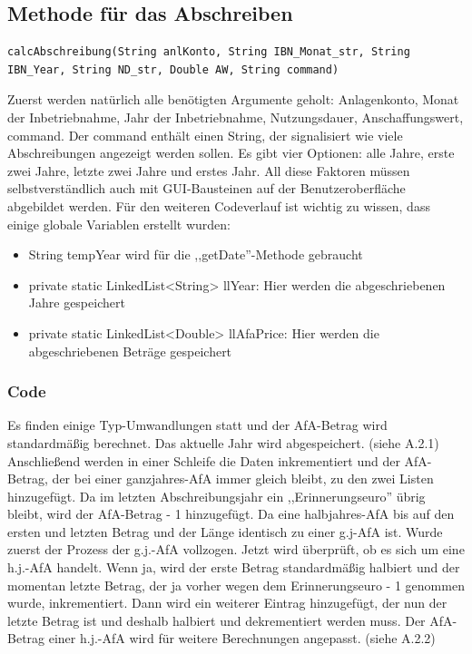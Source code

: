 \documentclass[12pt]{report}
\begin{document}
\subsection{Methode für das Abschreiben}
  
\begin{lstlisting}
calcAbschreibung(String anlKonto, String IBN_Monat_str, String IBN_Year, String ND_str, Double AW, String command)
\end{lstlisting}
Zuerst werden natürlich alle benötigten Argumente geholt: Anlagenkonto, Monat der Inbetriebnahme, Jahr der Inbetriebnahme, Nutzungsdauer, Anschaffungswert, command. Der command enthält einen String, der signalisiert wie viele Abschreibungen angezeigt werden sollen. Es gibt vier Optionen: alle Jahre, erste zwei Jahre, letzte zwei Jahre und erstes Jahr. All diese Faktoren müssen selbstverständlich auch mit GUI-Bausteinen auf der Benutzeroberfläche abgebildet werden.
Für den weiteren Codeverlauf ist wichtig zu wissen, dass einige globale Variablen erstellt wurden:\\

\begin{itemize}
	\item String tempYear wird für die ,,getDate''-Methode gebraucht
	\item private static LinkedList<String> llYear: Hier werden die abgeschriebenen Jahre gespeichert
	\item private static LinkedList<Double> llAfaPrice: Hier werden die abgeschriebenen Beträge gespeichert
\end{itemize}

\subsubsection{Code}
Es finden einige Typ-Umwandlungen statt und der AfA-Betrag wird standardmäßig berechnet. Das aktuelle Jahr wird abgespeichert. (siehe A.2.1)\\



\noindent Anschließend werden in einer Schleife die Daten inkrementiert und der AfA-Betrag, der bei einer ganzjahres-AfA immer gleich bleibt, zu den zwei Listen hinzugefügt.  Da im letzten Abschreibungsjahr ein ,,Erinnerungseuro'' übrig bleibt, wird der AfA-Betrag - 1 hinzugefügt. Da eine halbjahres-AfA bis auf den ersten und letzten Betrag und der Länge identisch zu einer g.j-AfA ist. Wurde zuerst der Prozess der g.j.-AfA vollzogen. Jetzt wird überprüft, ob es sich um eine h.j.-AfA handelt. Wenn ja, wird der erste Betrag standardmäßig halbiert und der momentan letzte Betrag, der ja vorher wegen dem Erinnerungseuro - 1 genommen wurde, inkrementiert. Dann wird ein weiterer Eintrag hinzugefügt, der nun der letzte Betrag ist und deshalb halbiert und dekrementiert werden muss. Der AfA-Betrag einer h.j.-AfA wird für weitere Berechnungen angepasst. (siehe A.2.2)\\
	
\end{document}
